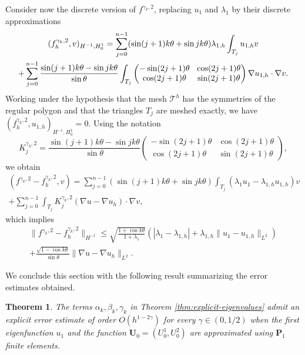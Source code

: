 \documentclass[JEP,XML,SOM,Unicode,ThmDefs,NoFloatCountersInSection,published]{cedram}
\newcommand{\colsep}{\arraycolsep4.5pt}
\theoremstyle{plain}
\newtheorem{thm}{Theorem}[section]
\theoremstyle{definition}
\newcommand{\bo}[1]{{\boldsymbol#1}}
\begin{document}
Consider now the discrete version of $f^{\gamma_k,2}$, replacing $u_1$ and $\lambda_1$ by their discrete approximations
\vspace*{-5pt}
\begin{multline*}
(f_h^{\gamma_k,2},v)_{H^{-1},H_0^1} = \sum_{j=0}^{n-1} (\sin(j+1)k\theta+\sin jk\theta) \lambda_{1,h} \int_{T_j} u_{1,h}v\\
\colsep+ \sum_{j=0}^{n-1} \frac{\sin(j+1)k\theta-\sin jk\theta}{\sin \theta} \int_{T_j}\begin{pmatrix}
-\sin (2j+1)\theta & \cos (2j+1) \theta \\
\cos (2j+1)\theta & \sin (2j+1)\theta
\end{pmatrix}\nabla u_{1,h} \cdot \nabla v.
\end{multline*}
Working under the hypothesis that the mesh $\mathcal T^h$ has the symmetries of the regular polygon and that the triangles $T_j$ are meshed exactly, we have $(f_h^{\gamma_k,2},u_{1,h})_{H^{-1},H_0^1} = 0$. Using the notation
\[
K_j^{\gamma_k,2} = \frac{\sin(j+1)k\theta-\sin jk\theta}{\sin \theta} \begin{pmatrix}
-\sin (2j+1)\theta & \cos (2j+1) \theta \\
\cos(2j+1)\theta & \sin (2j+1)\theta
\end{pmatrix},
\]
we obtain\vspace*{-5pt}
\begin{multline*}
(f^{\gamma_k,2}-f^{\gamma_k,2}_h,v) = \sum_{j=0}^{n-1} (\sin (j+1)k\theta+\sin jk\theta) \int_{T_j}(\lambda_1 u_1-\lambda_{1,h}u_{1,h})v\\[-10pt]
+ \sum_{j=0}^{n-1} \int_{T_j}K_j^{\gamma_k,2}(\nabla u - \nabla u_h)\cdot \nabla v,
\end{multline*}
which implies\vspace*{-5pt}
\begin{multline*}
\|f^{\gamma_k,2}-f_h^{\gamma_k,2} \|_{H^{-1}} \leq \sqrt{\frac{1+\cos k\theta}{1+\lambda_1}}(|\lambda_1-\lambda_{1,h}|+\lambda_{1,h}\|u_1-u_{1,h}\|_{L^2}) \\
+ \frac{\sqrt{1-\cos k\theta}}{\sin \theta} \|\nabla u-\nabla u_h\|_{L^2}.
\end{multline*}

We conclude this section with the following result summarizing the error estimates obtained.

\begin{thm}
The terms $\alpha_k,\beta_k,\gamma_k$ in Theorem \ref{thm:explicit-eigenvalues} admit an explicit error estimate of order $O(h^{1-2\gamma})$ for every $\gamma \in (0,1/2)$ when the first eigenfunction $u_1$ and the function $\bo U_0=(U_0^1,U_0^2)$ are approximated using $\bo P_1$ finite elements.
\label{thm:estimate-abc-P1}
\end{thm}
\end{document}
